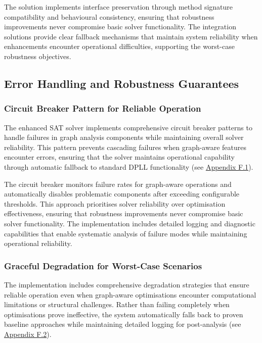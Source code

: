 The solution implements interface preservation through method signature compatibility and behavioural consistency, ensuring that robustness improvements never compromise basic solver functionality. The integration solutions provide clear fallback mechanisms that maintain system reliability when enhancements encounter operational difficulties, supporting the worst-case robustness objectives.

\subsection{Error Handling and Robustness Guarantees}

\subsubsection{Circuit Breaker Pattern for Reliable Operation}

The enhanced SAT solver implements comprehensive circuit breaker patterns to handle failures in graph analysis components while maintaining overall solver reliability. This pattern prevents cascading failures when graph-aware features encounter errors, ensuring that the solver maintains operational capability through automatic fallback to standard DPLL functionality (see \hyperref[appendix:circuit-breaker]{Appendix F.1}).

The circuit breaker monitors failure rates for graph-aware operations and automatically disables problematic components after exceeding configurable thresholds. This approach prioritises solver reliability over optimisation effectiveness, ensuring that robustness improvements never compromise basic solver functionality. The implementation includes detailed logging and diagnostic capabilities that enable systematic analysis of failure modes while maintaining operational reliability.

\subsubsection{Graceful Degradation for Worst-Case Scenarios}

The implementation includes comprehensive degradation strategies that ensure reliable operation even when graph-aware optimisations encounter computational limitations or structural challenges. Rather than failing completely when optimisations prove ineffective, the system automatically falls back to proven baseline approaches while maintaining detailed logging for post-analysis (see \hyperref[appendix:graceful-degradation]{Appendix F.2}).

